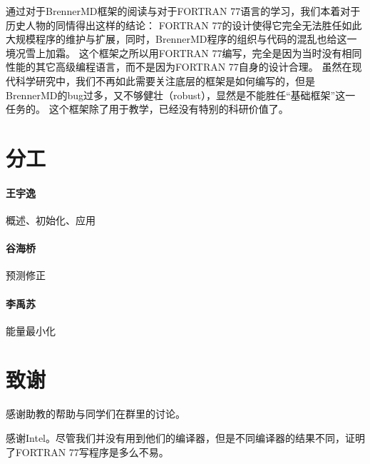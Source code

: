 \documentclass[UTF-8]{ctexart}
\begin{document}
通过对于BrennerMD框架的阅读与对于FORTRAN 77语言的学习，我们本着对于历史人物的同情得出这样的结论：
FORTRAN 77的设计使得它完全无法胜任如此大规模程序的维护与扩展，同时，BrennerMD程序的组织与代码的混乱也给这一境况雪上加霜。
这个框架之所以用FORTRAN 77编写，完全是因为当时没有相同性能的其它高级编程语言，而不是因为FORTRAN 77自身的设计合理。
虽然在现代科学研究中，我们不再如此需要关注底层的框架是如何编写的，但是BrennerMD的bug过多，又不够健壮（robust），显然是不能胜任“基础框架”这一任务的。
这个框架除了用于教学，已经没有特别的科研价值了。

\section{分工}
\paragraph{王宇逸}概述、初始化、应用
\paragraph{谷海桥}预测修正
\paragraph{李禹苏}能量最小化

\section{致谢}
感谢助教的帮助与同学们在群里的讨论。

感谢Intel。尽管我们并没有用到他们的编译器，但是不同编译器的结果不同，证明了FORTRAN 77写程序是多么不易。
\end{document}
